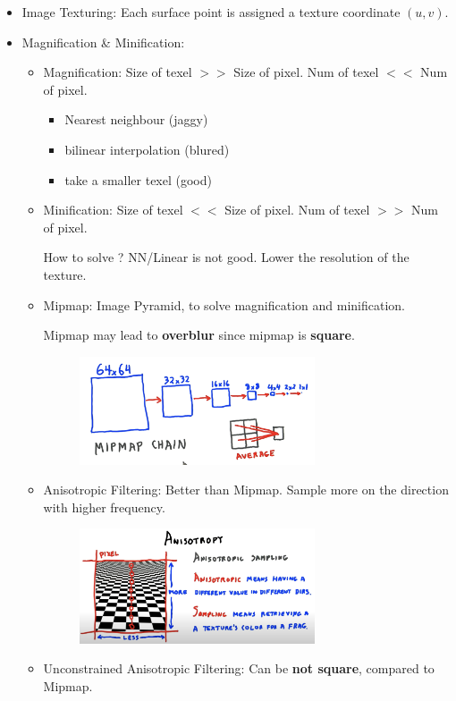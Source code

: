 \documentclass{article}
\begin{document}
\begin{itemize}
    \item Image Texturing: Each surface point is assigned a texture coordinate $(u,v)$.
    
    \item Magnification \& Minification:
\begin{itemize}
    \item  Magnification: Size of texel $>>$ Size of pixel. Num of texel $<<$ Num of pixel.
    \begin{itemize}
        \item Nearest neighbour (jaggy)
        \item bilinear interpolation (blured)
        \item take a smaller texel (good)
    \end{itemize}
    
    \item Minification: Size of texel $<<$ Size of pixel. Num of texel $>>$ Num of pixel.
    
    How to solve ? NN/Linear is not good. Lower the resolution of the texture.
    
    \item Mipmap: Image Pyramid, to solve magnification and minification.
    
    Mipmap may lead to \textbf{overblur} since mipmap is \textbf{square}.
    \begin{figure}[H]
        \centering
        \includegraphics[width=0.7\textwidth]{imgs/mipmap.png}
    \end{figure}
    


\item Anisotropic Filtering: Better than Mipmap. Sample more on the direction with higher frequency.
\begin{figure}[H]
        \centering
        \includegraphics[width=0.7\textwidth]{imgs/ani_sample.png}
    \end{figure}
\item Unconstrained Anisotropic Filtering: Can be \textbf{not square}, compared to Mipmap.
 

\end{itemize}
\end{itemize}
\end{document}

